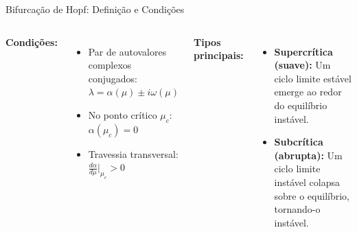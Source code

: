 \begin{frame}{Bifurcação de Hopf: Definição e Condições}

\vspace{0.2cm}

\begin{columns}
\textbf{Condições:}
\begin{itemize}
    \item Par de autovalores complexos conjugados: $\lambda = \alpha(\mu) \pm i\omega(\mu)$
    \item No ponto crítico $\mu_c$: $\alpha(\mu_c) = 0$
    \item Travessia transversal: $\frac{d\alpha}{d\mu}\bigg|_{\mu_c} > 0$
\end{itemize}

\textbf{Tipos principais:}
\begin{itemize}
    \item \textbf{Supercrítica (suave):} Um ciclo limite estável emerge ao redor do equilíbrio instável.
    \item \textbf{Subcrítica (abrupta):} Um ciclo limite instável colapsa sobre o equilíbrio, tornando-o instável.
\end{itemize}
\end{columns}
\end{frame}

